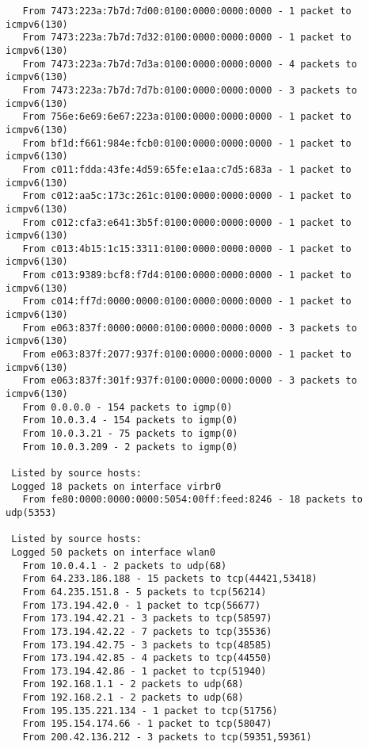\begin{lstlisting}
   From 7473:223a:7b7d:7d00:0100:0000:0000:0000 - 1 packet to icmpv6(130)
   From 7473:223a:7b7d:7d32:0100:0000:0000:0000 - 1 packet to icmpv6(130)
   From 7473:223a:7b7d:7d3a:0100:0000:0000:0000 - 4 packets to icmpv6(130)
   From 7473:223a:7b7d:7d7b:0100:0000:0000:0000 - 3 packets to icmpv6(130)
   From 756e:6e69:6e67:223a:0100:0000:0000:0000 - 1 packet to icmpv6(130)
   From bf1d:f661:984e:fcb0:0100:0000:0000:0000 - 1 packet to icmpv6(130)
   From c011:fdda:43fe:4d59:65fe:e1aa:c7d5:683a - 1 packet to icmpv6(130)
   From c012:aa5c:173c:261c:0100:0000:0000:0000 - 1 packet to icmpv6(130)
   From c012:cfa3:e641:3b5f:0100:0000:0000:0000 - 1 packet to icmpv6(130)
   From c013:4b15:1c15:3311:0100:0000:0000:0000 - 1 packet to icmpv6(130)
   From c013:9389:bcf8:f7d4:0100:0000:0000:0000 - 1 packet to icmpv6(130)
   From c014:ff7d:0000:0000:0100:0000:0000:0000 - 1 packet to icmpv6(130)
   From e063:837f:0000:0000:0100:0000:0000:0000 - 3 packets to icmpv6(130)
   From e063:837f:2077:937f:0100:0000:0000:0000 - 1 packet to icmpv6(130)
   From e063:837f:301f:937f:0100:0000:0000:0000 - 3 packets to icmpv6(130)
   From 0.0.0.0 - 154 packets to igmp(0)
   From 10.0.3.4 - 154 packets to igmp(0)
   From 10.0.3.21 - 75 packets to igmp(0)
   From 10.0.3.209 - 2 packets to igmp(0)

 Listed by source hosts:
 Logged 18 packets on interface virbr0
   From fe80:0000:0000:0000:5054:00ff:feed:8246 - 18 packets to udp(5353)

 Listed by source hosts:
 Logged 50 packets on interface wlan0
   From 10.0.4.1 - 2 packets to udp(68)
   From 64.233.186.188 - 15 packets to tcp(44421,53418)
   From 64.235.151.8 - 5 packets to tcp(56214)
   From 173.194.42.0 - 1 packet to tcp(56677)
   From 173.194.42.21 - 3 packets to tcp(58597)
   From 173.194.42.22 - 7 packets to tcp(35536)
   From 173.194.42.75 - 3 packets to tcp(48585)
   From 173.194.42.85 - 4 packets to tcp(44550)
   From 173.194.42.86 - 1 packet to tcp(51940)
   From 192.168.1.1 - 2 packets to udp(68)
   From 192.168.2.1 - 2 packets to udp(68)
   From 195.135.221.134 - 1 packet to tcp(51756)
   From 195.154.174.66 - 1 packet to tcp(58047)
   From 200.42.136.212 - 3 packets to tcp(59351,59361)
\end{lstlisting}

